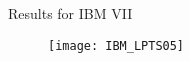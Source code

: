 \documentclass[9pt,xcolor=x11names,compress]{beamer}
\let\oldcite=\cite
\renewcommand{\cite}[1]{\textcolor{dblue}{\oldcite{#1}}}
\begin{document}
\begin{frame}{Results for IBM VII}
	\begin{figure}
		\centering
		\texttt{[image: IBM\_LPTS05]}
	\end{figure}
\end{frame}
%
%	
%
%
%
%
%
\end{document}
